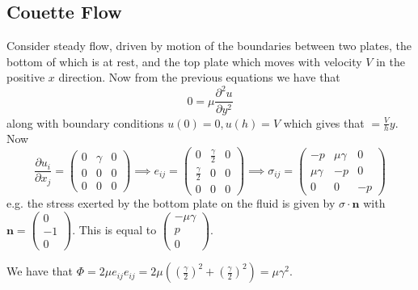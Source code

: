 \documentclass{article}
\begin{document}
\subsection{Couette Flow}
Consider steady flow, driven by motion of the boundaries between two plates, the bottom of which is at rest, and the top plate which moves with velocity $ V $ in the positive $ x $ direction. Now from the previous equations we have that
\[
	0 =\mu \frac{\partial^2 u}{\partial y^2}
\]
along with boundary conditions $ u(0) = 0, u(h)=V $ which gives that $ =\frac Vh y $. Now
\[
	\frac{\partial u_i}{\partial x_j} = \begin{pmatrix}
		0 & \gamma & 0 \\
		0 & 0 & 0 \\
		0 & 0 & 0
	\end{pmatrix} \implies e_{ij} = \begin{pmatrix}
		0 & \frac{\gamma} 2 & 0 \\
		\frac{\gamma}2 & 0 & 0 \\
		0 & 0 & 0
	\end{pmatrix}
	\implies \sigma_{ij} = \begin{pmatrix}
		-p & \mu\gamma & 0 \\
		\mu\gamma & -p & 0 \\
		0 & 0 & -p
	\end{pmatrix}
\]
e.g. the stress exerted by the bottom plate on the fluid is given by $ \sigma \cdot \mathbf n $ with $ \mathbf n = \begin{pmatrix}
	0 \\ -1 \\ 0
\end{pmatrix} $. This is equal to $ \begin{pmatrix}
  -\mu\gamma \\ p \\ 0
\end{pmatrix} $.\par
We have that $ \Phi = 2 \mu e_{ij}e_{ij} = 2\mu \left(\left(\frac \gamma 2\right)^2 + \left(\frac \gamma 2 \right)^2 \right) = \mu\gamma^2 $.
\end{document}
